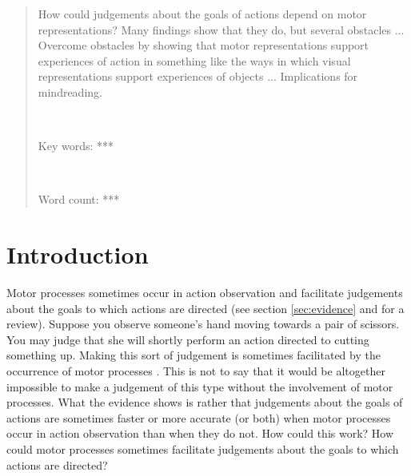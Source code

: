 \documentclass[12pt,\papersize]{extarticle}
\begin{document}
\setlength\footnotesep{1em}


\maketitle
\title{}









\begin{abstract}
\noindent
%
How could judgements about the goals of actions depend on motor representations? Many findings show that they do, but several obstacles ... Overcome obstacles by showing that motor representations support experiences of action in something like the ways in which visual representations support experiences of objects ... Implications for mindreading.
%

\ %

\noindent
Key words: ***

\ %

\noindent
Word count: ***
\end{abstract}









\section{Introduction}


Motor processes sometimes occur in action observation and facilitate judgements about the goals to which actions are directed (see section \vref{sec:evidence} and \citealp{rizzolatti_functional_2010} for a review). 
Suppose you observe someone's hand moving towards a pair of scissors. 
You may judge that she will shortly perform an action directed to cutting something up. 
Making this sort of judgement is sometimes facilitated by the occurrence of motor processes \citep{boria:2009_intention, ortigue:2010_understanding}.  
This is not to say that it would be altogether impossible to make a judgement of this type without the involvement of motor processes. 
What the evidence shows is rather that judgements about the goals of actions are sometimes faster or more accurate (or both) when motor processes occur in action observation than when they do not.
How could this work? 
How could motor processes sometimes facilitate judgements about the goals to which actions are directed?
\end{document}
